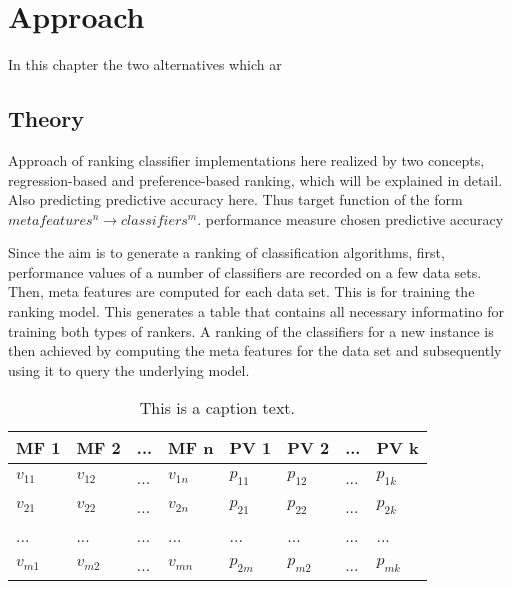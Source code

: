 %
\chapter{Approach}
\label{sec:approach}

In this chapter the two alternatives which ar

\section{Theory}

Approach of ranking classifier implementations here realized by two concepts, regression-based and preference-based ranking, which will be explained in detail. Also predicting predictive accuracy here. Thus target function of the form $meta features^n \rightarrow classifiers^m$.
performance measure chosen predictive accuracy

Since the aim is to generate a ranking of classification algorithms, first, performance values of a number of classifiers are recorded on a few data sets. Then, meta features are computed for each data set. This is for training the ranking model. This generates a table that contains all necessary informatino for training both types of rankers. A ranking of the classifiers for a new instance is then achieved by computing the meta features for the data set and subsequently using it to query the underlying model. 

\begin{table}[h]
\centering
	\begin{tabularx}{\textwidth}{X | X | X | X | X | X | X | X}
		MF 1			& MF 2		& ... 	& MF n		& PV 1 		& PV 2 		&	...	&	PV k 		\\ \hline
		$v_{11}$		& $v_{12}$	& ...	& $v_{1n}$	& $p_{11}$	& $p_{12}$	& 	...	&	$p_{1k}$		\\ \hline
		$v_{21}$		& $v_{22}$	& ...	& $v_{2n}$	& $p_{21}$	& $p_{22}$	& 	...	&	$p_{2k}$		\\ \hline
		...			& ...		& ...	& ...		& ...		& ...		&	...	&	...			\\ \hline
		$v_{m1}$		& $v_{m2}$	& ... 	& $v_{mn}$	& $p_{2m}$	& $p_{m2}$	& 	...	&	$p_{mk}$			 
	\end{tabularx}
	\label{tab:table1}
	\caption{This is a caption text.}
\end{table}

